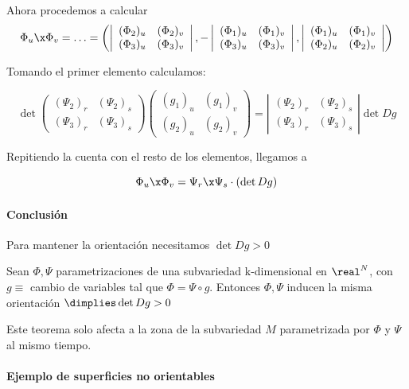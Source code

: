 Ahora procedemos a calcular 
\[\Phi_u\x\Phi_v = \dotsc = \left(
\left|\begin{array}{cc}
(\Phi_2)_u & (\Phi_2)_v\\
(\Phi_3)_u & (\Phi_3)_v
\end{array}
\right|,-
\left|\begin{array}{cc}
(\Phi_1)_u & (\Phi_1)_v\\
(\Phi_3)_u & (\Phi_3)_v
\end{array}
\right|,
\left|\begin{array}{cc}
(\Phi_1)_u & (\Phi_1)_v\\
(\Phi_2)_u & (\Phi_2)_v
\end{array}
\right|
\right)\]

Tomando el primer elemento calculamos:

\[
\det\left(
\begin{array}{cc}
(\Psi_2)_r & (\Psi_2)_s\\
(\Psi_3)_r & (\Psi_3)_s
\end{array}
\right)\begin{pmatrix}
(g_1)_u &(g_1)_v \\
(g_2)_u & (g_2)_v
\end{pmatrix} =
\left| \begin{array}{cc}
(\Psi_2)_r & (\Psi_2)_s\\
(\Psi_3)_r & (\Psi_3)_s
\end{array}\right| \det Dg
\]

Repitiendo la cuenta con el resto de los elementos, llegamos a

\[\Phi_u\x\Phi_v = \Psi_r\x\Psi_s\cdot (\det Dg)\]

\paragraph{Conclusión} Para mantener la orientación necesitamos $\det Dg > 0$

\begin{defn}
Sean $\Phi,\Psi$ parametrizaciones de una subvariedad k-dimensional en $\real^N$, con $g \equiv$ cambio de variables tal que $\Phi=\Psi \circ g$.
Entonces $\Phi,\Psi$ inducen la misma orientación $\dimplies \det Dg>0$
\end{defn}

\obs Este teorema solo afecta a la zona de la subvariedad $M$ parametrizada por $\Phi$ y $\Psi$ al mismo tiempo.

\paragraph{Ejemplo de superficies no orientables}

